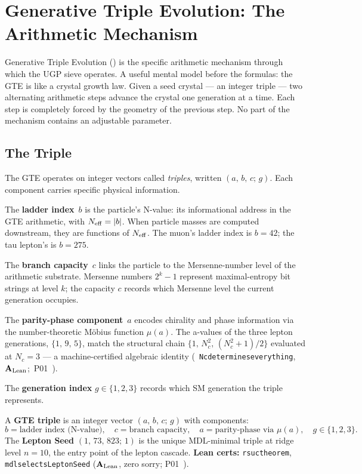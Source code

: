 \documentclass[11pt,openany]{book}
\theoremstyle{remark}
\newcommand{\GTE}{\text{GTE}}
\newcommand{\lean}[1]{%
  \penalty-100
  \begingroup\def\_{\textunderscore\allowbreak}\texttt{#1}\endgroup}
\newcommand{\Nc}{N_c}
\newcommand{\CatAL}{\ensuremath{\textbf{A}_{\rm Lean}}}
\begin{document}
\section{Generative Triple Evolution: The Arithmetic Mechanism}
\label{sec:gte_what}

Generative Triple Evolution (\GTE) is the specific arithmetic mechanism through which
the UGP sieve operates.
A useful mental model before the formulas: the GTE is like a crystal growth law.
Given a seed crystal --- an integer triple --- two alternating arithmetic steps advance
the crystal one generation at a time.
Each step is completely forced by the geometry of the previous step.
No part of the mechanism contains an adjustable parameter.

\subsection{The Triple}
\label{sec:gte_triple}

The GTE operates on integer vectors called \emph{triples}, written $(a,\,b,\,c;\,g)$.
Each component carries specific physical information.

The \textbf{ladder index}~$b$ is the particle's N-value: its informational address
in the GTE arithmetic, with $N_{\rm eff} = |b|$.
When particle masses are computed downstream, they are functions of $N_{\rm eff}$.
The muon's ladder index is $b = 42$; the tau lepton's is $b = 275$.

The \textbf{branch capacity}~$c$ links the particle to the Mersenne-number level of
the arithmetic substrate.
Mersenne numbers $2^k - 1$ represent maximal-entropy bit strings at level $k$;
the capacity $c$ records which Mersenne level the current generation occupies.

The \textbf{parity-phase component}~$a$ encodes chirality and phase information via
the number-theoretic M\"{o}bius function $\mu(a)$.
The a-values of the three lepton generations, $\{1,\,9,\,5\}$, match the structural
chain $\{1,\,\Nc^2,\,(\Nc^2 + 1)/2\}$ evaluated at $\Nc = 3$ --- a machine-certified
algebraic identity \mbox{(\lean{N\_c\_determines\_everything}, \CatAL; P01 \cite{SpivackSM})}.

The \textbf{generation index} $g \in \{1,2,3\}$ records which SM generation the triple
represents.

\begin{tcolorbox}[colback=green!5,colframe=green!50!black,
  title={Definition: GTE Triple},breakable]
A \textbf{GTE triple} is an integer vector $(a,\,b,\,c;\,g)$ with components:
\[
  b = \text{ladder index (N-value)}, \quad
  c = \text{branch capacity}, \quad
  a = \text{parity-phase via }\mu(a), \quad
  g \in \{1,2,3\}.
\]
The \textbf{Lepton Seed} $(1,\,73,\,823;\,1)$ is the unique MDL-minimal triple at
ridge level $n = 10$, the entry point of the lepton cascade.
\textbf{Lean certs:} \lean{rsuc\_theorem}, \lean{mdl\_selects\_LeptonSeed} (\CatAL, zero sorry; P01~\cite{SpivackSM}).
\end{tcolorbox}
\end{document}
